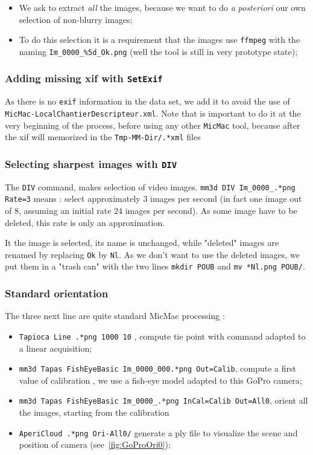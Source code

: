 \begin{itemize}
   \item We ask to extract \emph{all} the images, because we want to do  \emph{a posteriori} our own selection 
         of non-blurry images;
   \item To do this selection it is a requirement that the images use {\tt ffmpeg}  with the naming
          {\tt Im\_0000\_\%5d\_Ok.png}  (well the tool is still in very prototype state);

\end{itemize}


\subsubsection{Adding missing xif with {\tt SetExif}}

As there is no {\tt exif} information in the data set, we  add it to avoid the use of {\tt MicMac-LocalChantierDescripteur.xml}.
Note that is important to do it at the very beginning of the process, before using any other {\tt MicMac} tool, because after the xif 
will memorized in the {\tt Tmp-MM-Dir/.*xml} files


\subsubsection{Selecting sharpest images with  {\tt DIV}}

The {\tt DIV} command, makes selection of video images.
{\tt mm3d DIV Im\_0000\_.*png Rate=3} means : select approximately $3$ images per second 
(in fact one image out of $8$, assuming an initial rate $24$ images per second).  As some image have to be deleted,
this rate is only an approximation.

It the image is selected, its name is unchanged, while "deleted" images are renamed by replacing {\tt Ok} by {\tt Nl}.
As we don't want to use the deleted images, we put them in a "trash can" with the two lines 
{\tt mkdir POUB} and {\tt mv *Nl.png POUB/}.


\subsubsection{Standard orientation}

The three next line are quite standard MicMac processing :

\begin{itemize}
    \item {\tt  Tapioca Line .*png 1000 10} , compute tie point with command adapted to a linear acquisition;
    \item {\tt  mm3d Tapas  FishEyeBasic Im\_0000\_000.*png Out=Calib}, compute a first value of calibration , we
         use a fish-eye model adapted to this GoPro camera;
    \item {\tt  mm3d Tapas  FishEyeBasic Im\_0000\_.*png InCal=Calib Out=All0}, orient all the images, starting from
         the calibration
    \item {\tt  AperiCloud  .*png Ori-All0/} generate a ply file to visualize the scene and position of camera (see~\ref{fig:GoProOri0});

\end{itemize}

